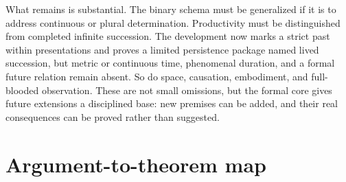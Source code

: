 \documentclass[11pt]{article}
\theoremstyle{definition}
\theoremstyle{remark}
\begin{document}
What remains is substantial. The binary schema must be generalized if it is to
address continuous or plural determination. Productivity must be distinguished
from completed infinite succession. The development now marks a strict past
within presentations and proves a limited persistence package named lived
succession, but metric or continuous time, phenomenal duration, and a formal
future relation remain absent. So do space, causation, embodiment, and
full-blooded observation. These are not small omissions, but the formal core
gives future extensions a disciplined base: new premises can be added, and
their real consequences can be proved rather than suggested.

\appendix

\section{Argument-to-theorem map}
\end{document}
